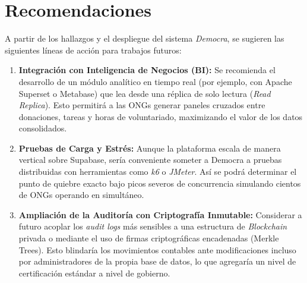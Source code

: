 \documentclass[11pt,a4paper,oneside]{report}
\begin{document}
\section{Recomendaciones}
A partir de los hallazgos y el despliegue del sistema \textit{Democra}, se sugieren las siguientes l\'ineas de acci\'on para trabajos futuros:

\begin{enumerate}
    \item \textbf{Integraci\'on con Inteligencia de Negocios (BI):} Se recomienda el desarrollo de un m\'odulo anal\'itico en tiempo real (por ejemplo, con Apache Superset o Metabase) que lea desde una r\'eplica de solo lectura (\textit{Read Replica}). Esto permitir\'a a las ONGs generar paneles cruzados entre donaciones, tareas y horas de voluntariado, maximizando el valor de los datos consolidados.
    \item \textbf{Pruebas de Carga y Estr\'es:} Aunque la plataforma escala de manera vertical sobre Supabase, ser\'ia conveniente someter a Democra a pruebas distribuidas con herramientas como \textit{k6} o \textit{JMeter}. As\'i se podr\'a determinar el punto de quiebre exacto bajo picos severos de concurrencia simulando cientos de ONGs operando en simult\'aneo.
    \item \textbf{Ampliaci\'on de la Auditor\'ia con Criptograf\'ia Inmutable:} Considerar a futuro acoplar los \textit{audit logs} m\'as sensibles a una estructura de \textit{Blockchain} privada o mediante el uso de firmas criptogr\'aficas encadenadas (Merkle Trees). Esto blindar\'ia los movimientos contables ante modificaciones incluso por administradores de la propia base de datos, lo que agregar\'ia un nivel de certificaci\'on est\'andar a nivel de gobierno.
\end{enumerate}
\end{document}
